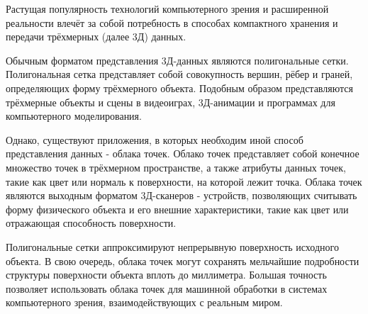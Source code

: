 Растущая популярность\cite{XRgrows} технологий компьютерного зрения и
расширенной реальности влечёт за собой потребность в способах компактного
хранения и передачи трёхмерных (далее 3Д) данных.

Обычным форматом представления 3Д-данных являются полигональные сетки.
Полигональная сетка представляет собой совокупность вершин, рёбер и граней,
определяющих форму трёхмерного объекта. Подобным образом представляются
трёхмерные объекты и сцены в видеоиграх, 3Д-анимации и программах для
компьютерного моделирования.

Однако, существуют приложения, в которых необходим иной способ представления
данных - облака точек. Облако точек представляет собой конечное множество точек
в трёхмерном пространстве, а также атрибуты данных точек, такие как цвет или
нормаль к поверхности, на которой лежит точка. Облака точек являются выходным
форматом 3Д-сканеров - устройств, позволяющих считывать форму физического
объекта и его внешние характеристики, такие как цвет или отражающая способность
поверхности\cite[10]{SurfaceReconstruction}.

Полигональные сетки аппроксимируют непрерывную поверхность исходного объекта. В
свою очередь, облака точек могут сохранять мельчайшие подробности структуры
поверхности объекта вплоть до миллиметра\cite[33]{SurfaceReconstruction}.
Большая точность позволяет использовать облака точек для машинной обработки в
системах компьютерного зрения, взаимодействующих с реальным миром.







